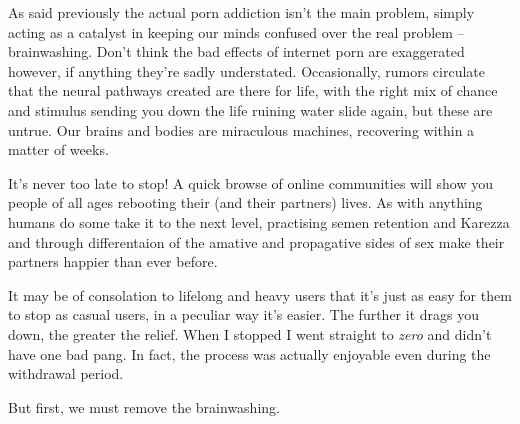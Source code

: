 \documentclass[easypeasy.tex]{subfiles}
\begin{document}
As said previously the actual porn addiction isn't the main problem, simply acting as a catalyst in keeping our minds confused over the real problem -- brainwashing. Don't think the bad effects of internet porn are exaggerated however, if anything they're sadly understated. Occasionally, rumors circulate that the neural pathways created are there for life, with the right mix of chance and stimulus sending you down the life ruining water slide again, but these are untrue. Our brains and bodies are miraculous machines, recovering within a matter of weeks.

It's never too late to stop! A quick browse of online communities will show you people of all ages rebooting their (and their partners) lives. As with anything humans do some take it to the next level, practising semen retention and Karezza and through differentaion of the amative and propagative sides of sex make their partners happier than ever before.

It may be of consolation to lifelong and heavy users that it's just as easy for them to stop as casual users, in a peculiar way it's easier. The further it drags you down, the greater the relief. When I stopped I went straight to \textit{zero} and didn't have one bad pang. In fact, the process was actually enjoyable even during the withdrawal period.

But first, we must remove the brainwashing.
\end{document}
